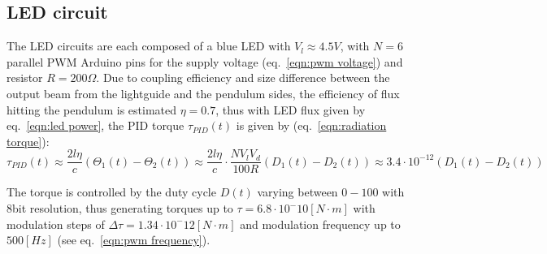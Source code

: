 \documentclass[\main/master.tex]{subfiles}
\begin{document}
\subsection{LED circuit}
The LED circuits are each composed of a blue LED with $V_l\approx 4.5V$, with $N=6$ parallel PWM Arduino pins for the supply voltage (eq.~\ref{eqn:pwm voltage}) and resistor $R = 200\Omega$. Due to coupling efficiency and size difference between the output beam from the lightguide and the pendulum sides, the efficiency of flux hitting the pendulum is estimated $\eta = 0.7$, thus with LED flux given by eq.~\ref{eqn:led power}, the PID torque $\tau_{PID}(t)$ is given by (eq.~\ref{eqn:radiation torque}):
\begin{equation}
\tau_{PID}(t) \approx \frac{2l\eta}{{c}} (\Theta_1(t) -\Theta_2(t)) \approx \frac{2l\eta}{{c}} \cdot\frac{N V_l V_d}{100R}(D_1(t) -D_2(t))  \approx   3.4\cdot 10^{-12}(D_1(t) -D_2(t)) 
\label{eqn:led torque}
\end{equation}
\par\noindent
The torque is controlled by the duty cycle $D(t)$ varying between $0-100$ with 8bit resolution, thus generating torques up to $\tau = 6.8\cdot10^-{10} [N\cdot m]$ with modulation steps of $\Delta\tau = 1.34\cdot10^-{12} [N\cdot m]$ and modulation frequency up to $500[Hz]$ (see eq.~\ref{eqn:pwm frequency}).
\end{document}
